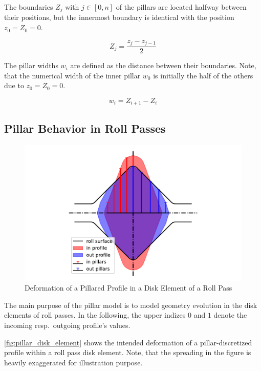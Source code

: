\documentclass[11pt]{PyRollDocs}
\begin{document}
    The boundaries $Z_j$ with $j \in [0, n]$ of the pillars are located halfway between their positions, but the innermost boundary is identical with the position $z_0 = Z_0 = 0$.

    \begin{equation}
        Z_j = \frac{z_j - z_{j-1}}{2}
        \label{eq:pillar_boundaries}
    \end{equation}

    The pillar widths $w_i$ are defined as the distance between their boundaries.
    Note, that the numerical width of the inner pillar $w_0$ is initially the half of the others due to $z_0 = Z_0 = 0$.

    \begin{equation}
        w_i = Z_{i+1} - Z_i
        \label{eq:pillar_widths}
    \end{equation}

    \subsection{Pillar Behavior in Roll Passes}\label{subsec:pillar-behavior-in-roll-passes}

    \begin{figure}
        \centering
        \includegraphics[width=0.6\linewidth]{img/pillar_disk_element}
        \caption{Deformation of a Pillared Profile in a Disk Element of a Roll Pass}
        \label{fig:pillar_disk_element}
    \end{figure}

    The main purpose of the pillar model is to model geometry evolution in the disk elements of roll passes.
    In the following, the upper indizes $0$ and $1$ denote the incoming resp.~outgoing profile's values.

    \autoref{fig:pillar_disk_element} shows the intended deformation of a pillar-discretized profile within a roll pass disk element.
    Note, that the spreading in the figure is heavily exaggerated for illustration purpose.
\end{document}
